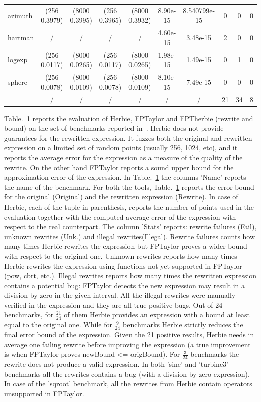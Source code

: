 \documentclass[runningheads]{llncs}
\begin{document}
\begin{table}[h]
\begin{adjustbox}{center}
\begin{tabular}{l|c|c|c|c|c|c|c|c|c|}
		azimuth &(256 0.3979) &(8000 0.3995)&(256 0.3965) &(8000 0.3932)& 8.90e-15 & 8.540799e-15 & 0& 0& 0\\
		hartman &/&/&/&/& 4.60e-15 & 3.48e-15& 2& 0& 0\\
		logexp &(256 0.0117) &(8000 0.0265)&(256 0.0117) &(8000 0.0265)& 1.98e-15& 1.49e-15& 0& 1& 0\\
		sphere &(256 0.0078) &(8000 0.0109)&(256 0.0078) &(8000 0.0109)& 8.10e-15& 7.49e-15& 0& 0& 0\\
		\hline
		&/&/&/&/ & / & / & 21 & 34 &8\\		
		\hline
	\end{tabular}
	\label{tab:table}
\end{adjustbox}
\end{table}



Table.~\ref{tab:table} reports the evaluation of Herbie, FPTaylor and FPTherbie (rewrite and bound) on the set of benchmarks reported in~\cite{fptaylor}. Herbie does not provide guarantees for the rewritten expression. It fuzzes both the original and rewritten expression on a limited set of random points (usually 256, 1024, etc), and it reports the average error for the expression as a measure of the quality of the rewrite. On the other hand FPTaylor reports a sound upper bound for the approximation error of the expression.
In Table.~\ref{tab:table} the columns 'Name' reports the name of the benchmark. For both the tools, Table.~\ref{tab:table} reports the error bound for the original (Original) and the rewritten expression (Rewrite).
In case of Herbie, each of the tuple in parenthesis, reports the number of points used in the evaluation together with the computed average error of the expression with respect to the real counterpart. The column 'Stats' reports: rewrite failures (Fail), unknown rewrites (Unk.) and illegal rewrites(Illegal). Rewrite failures counts how many times Herbie rewrites the expression but FPTaylor proves a wider bound with respect to the original one. Unknown rewrites reports how many times Herbie rewrites the expression using functions not yet supported in FPTaylor (pow, cbrt, etc.). Illegal rewrites reports how many times the rewritten expression contains a potential bug: FPTaylor detects the new expression may result in a division by zero in the given interval. All the illegal rewrites were manually verified in the expression and they are all true positive bugs.
Out of 24 benchmarks, for $\frac{21}{24}$ of them Herbie provides an expression with a bound at least equal to the original one. While for $\frac{9}{24}$ benchmarks Herbie strictly reduces the final error bound of the expression. 
Given the 21 positive results, Herbie needs in average one failing rewrite before improving the expression (a true improvement is when FPTaylor proves newBound <= origBound).
For $\frac{3}{24}$ benchmarks the rewrite does not produce a valid expression. In both 'sine' and 'turbine3' benchmarks all the rewrites contains a bug (with a division by zero expression). 
In case of the 'sqroot' benchmark, all the rewrites from Herbie contain operators unsupported in FPTaylor.
\end{document}
